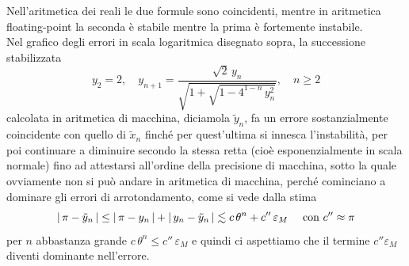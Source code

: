 \documentclass[12pt]{article}
\DeclarePairedDelimiter{\abs}{\lvert}{\rvert}
\begin{document}
Nell'aritmetica dei reali le due formule sono coincidenti, mentre in aritmetica floating-point la seconda è stabile mentre la prima è fortemente instabile.\\
Nel grafico degli errori in scala logaritmica disegnato sopra, la successione stabilizzata
\[ y_2=2, \quad y_{n+1}=\frac{\sqrt{2}\,y_n}{\sqrt{1+\sqrt{1-4^{1-n}\,y_n^2}}}, \quad n\ge 2 \]
calcolata in aritmetica di macchina, diciamola $\tilde{y}_n$, fa un errore sostanzialmente coincidente con quello di $\tilde{x}_n$ finché per quest'ultima si innesca l'instabilità, per poi continuare a diminuire secondo la stessa retta (cioè esponenzialmente in scala normale) fino ad attestarsi all'ordine della precisione di macchina, sotto la quale ovviamente non si può andare in aritmetica di macchina, perché cominciano a dominare gli errori di arrotondamento, come si vede dalla stima
\[\abs{\,\pi - \tilde{y}_n\,} \le \abs{\,\pi - y_n\,} + \abs{\,y_n - \tilde{y}_n\,} \lesssim c\,\theta^{n}+c''\,\varepsilon_M \quad \text{ con } c''\approx \pi \]
per $n$ abbastanza grande $c\,\theta^n\le c''\,\varepsilon_M$ e quindi ci aspettiamo che il termine $c''\varepsilon_{M}$ diventi dominante nell'errore.
\end{document}
